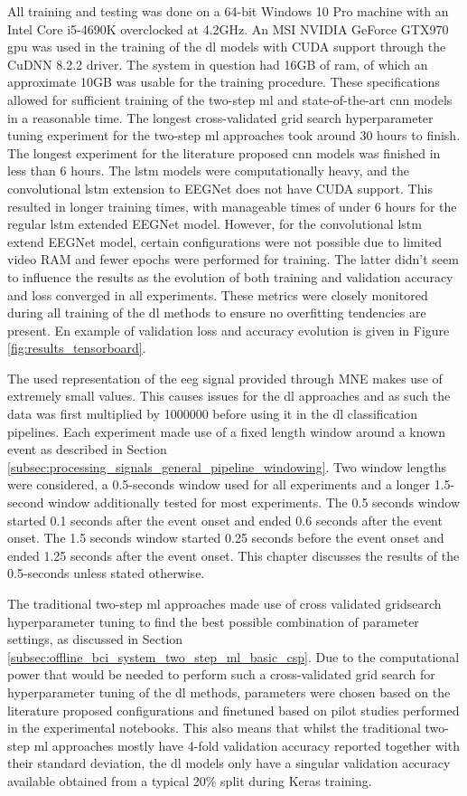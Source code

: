 All training and testing was done on a 64-bit Windows 10 Pro machine with an Intel Core i5-4690K overclocked at 4.2GHz.
An MSI NVIDIA GeForce GTX970 \gls{gpu} was used in the training of the \gls{dl} models with CUDA support through the CuDNN 8.2.2 driver.
The system in question had 16GB of ram, of which an approximate 10GB was usable for the training procedure.
These specifications allowed for sufficient training of the two-step \gls{ml} and state-of-the-art \gls{cnn} models in a reasonable time.
The longest cross-validated grid search hyperparameter tuning experiment for the two-step \gls{ml} approaches took around 30 hours to finish.
The longest experiment for the literature proposed \gls{cnn} models was finished in less than 6 hours.
The \gls{lstm} models were computationally heavy, and the convolutional \gls{lstm} extension to EEGNet does not have CUDA support.
This resulted in longer training times, with manageable times of under 6 hours for the regular \gls{lstm} extended EEGNet model.
However, for the convolutional \gls{lstm} extend EEGNet model, certain configurations were not possible due to limited video RAM and fewer epochs were performed for training.
The latter didn't seem to influence the results as the evolution of both training and validation accuracy and loss converged in all experiments.
These metrics were closely monitored during all training of the \gls{dl} methods to ensure no overfitting tendencies are present.
En example of validation loss and accuracy evolution is given in Figure \ref{fig:results_tensorboard}.

The used representation of the \gls{eeg} signal provided through MNE makes use of extremely small values.
This causes issues for the \gls{dl} approaches and as such the data was first multiplied by 1000000 before using it in the \gls{dl} classification pipelines.
Each experiment made use of a fixed length window around a known event as described in Section \ref{subsec:processing_signals_general_pipeline_windowing}.
Two window lengths were considered, a 0.5-seconds window used for all experiments and a longer 1.5-second window additionally tested for most experiments.
The 0.5 seconds window started 0.1 seconds after the event onset and ended 0.6 seconds after the event onset.
The 1.5 seconds window started 0.25 seconds before the event onset and ended 1.25 seconds after the event onset.
This chapter discusses the results of the 0.5-seconds unless stated otherwise.

The traditional two-step \gls{ml} approaches made use of cross validated gridsearch hyperparameter tuning to find the best possible combination of parameter settings, as discussed in Section \ref{subsec:offline_bci_system_two_step_ml_basic_csp}.
Due to the computational power that would be needed to perform such a cross-validated grid search for hyperparameter tuning of the \gls{dl} methods, parameters were chosen based on the literature proposed configurations and finetuned based on pilot studies performed in the experimental notebooks.
This also means that whilst the traditional two-step \gls{ml} approaches mostly have 4-fold validation accuracy reported together with their standard deviation, the \gls{dl} models only have a singular validation accuracy available obtained from a typical 20\% split during Keras training.

